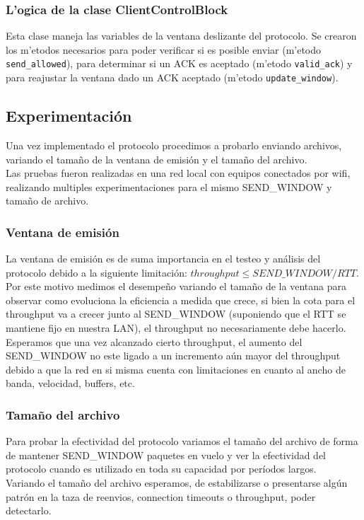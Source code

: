 \subsubsection{L'ogica de la clase ClientControlBlock}

Esta clase maneja las variables de la ventana deslizante del protocolo. Se crearon los m'etodos necesarios para poder verificar si es posible enviar (m'etodo \texttt{send\_allowed}), para determinar si un ACK es aceptado (m'etodo \texttt{valid\_ack}) y para reajustar la ventana dado un ACK aceptado (m'etodo \texttt{update\_window}).

\subsection{Experimentación}

Una vez implementado el protocolo procedimos a probarlo enviando archivos, variando el tamaño de la ventana de emisión y el tamaño del archivo.	 \\
\indent	Las pruebas fueron realizadas en una red local con equipos conectados por wifi, realizando multiples experimentaciones para el mismo SEND\_WINDOW y tamaño de archivo.

\subsubsection{Ventana de emisión}

La ventana de emisión es de suma importancia en el testeo y análisis del protocolo debido a la siguiente limitación: $throughput \leq SEND\_WINDOW / RTT$.	\\
\indent	Por este motivo medimos el desempeño variando el tamaño de la ventana para observar como evoluciona la eficiencia a medida que crece, si bien la cota para el throughput va a crecer junto al SEND\_WINDOW (suponiendo que el RTT se mantiene fijo en nuestra LAN), el throughput no necesariamente debe hacerlo. \\
\indent	Esperamos que una vez alcanzado cierto throughput, el aumento del SEND\_WINDOW no este ligado a un incremento aún mayor del throughput debido a que la red en si misma cuenta con limitaciones en cuanto al ancho de banda, velocidad, buffers, etc. 

\subsubsection{Tamaño del archivo}

Para probar la efectividad del protocolo variamos el tamaño del archivo de forma de mantener SEND\_WINDOW 
paquetes en vuelo y ver la efectividad del protocolo cuando es utilizado en toda su capacidad por períodos largos.	\\
\indent	Variando el tamaño del archivo esperamos, de estabilizarse o presentarse algún patrón en la taza de reenvios, connection timeouts o throughput, poder detectarlo.

